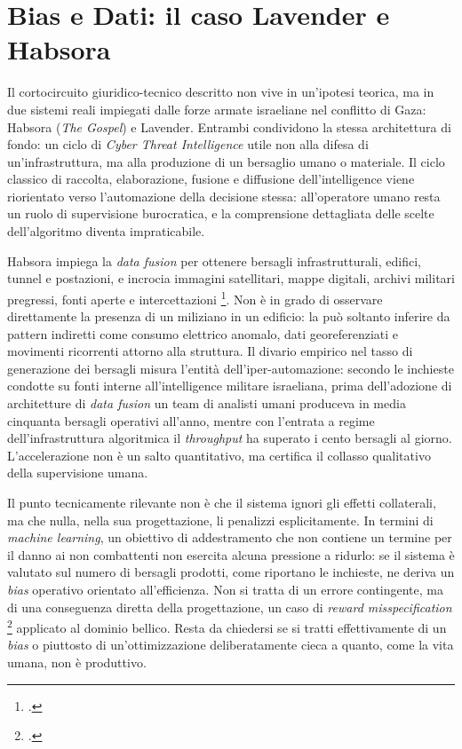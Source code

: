 \ifstampa\documentclass[a4paper,12pt,twoside,openright]{report}\else\documentclass[a4paper,12pt]{report}\fi
\newif\ifrevisione \revisionefalse
\DeclareRobustCommand{\rev}[1]{\ifrevisione{\color{blue!65!black}#1}\else#1\fi}
\begin{document}
\section{Bias e Dati: il caso Lavender e Habsora}

Il cortocircuito giuridico-tecnico descritto non vive in un'ipotesi teorica, ma
in due sistemi reali impiegati dalle forze armate israeliane nel conflitto di
Gaza: Habsora (\textit{The Gospel}) e Lavender. Entrambi condividono la stessa
architettura di fondo: un ciclo di \textit{Cyber Threat Intelligence} utile non
alla difesa di un'infrastruttura, ma alla produzione di un bersaglio umano o
materiale. Il ciclo classico di raccolta, elaborazione, fusione e diffusione
dell'intelligence viene riorientato verso l'automazione della decisione stessa:
all'operatore umano resta un ruolo di supervisione burocratica, e la comprensione
dettagliata delle scelte dell'algoritmo diventa impraticabile.

Habsora impiega la \textit{data fusion} per ottenere bersagli infrastrutturali,
edifici, tunnel e postazioni, e incrocia immagini satellitari, mappe digitali,
archivi militari pregressi, fonti aperte e intercettazioni
\footcite{abraham_2023_gospel}. Non è in grado di osservare direttamente la
presenza di un miliziano in un edificio: la può soltanto inferire da pattern
indiretti come consumo elettrico anomalo, dati georeferenziati e movimenti
ricorrenti attorno alla struttura. Il divario empirico nel tasso di generazione
dei bersagli misura l'entità dell'iper-automazione: secondo le inchieste condotte
su fonti interne all'intelligence militare israeliana, prima dell'adozione di
architetture di \textit{data fusion} un team di analisti umani produceva in media
cinquanta bersagli operativi all'anno, mentre con l'entrata a regime
dell'infrastruttura algoritmica il \textit{throughput} ha superato i cento
bersagli al giorno. L'accelerazione non è un salto quantitativo, ma certifica il
collasso qualitativo della supervisione umana.

Il punto tecnicamente rilevante non è che il sistema ignori gli effetti
collaterali, ma che \rev{nulla, nella sua progettazione, li penalizzi esplicitamente.
In termini di \textit{machine learning}, un obiettivo di addestramento che non
contiene un termine per il danno ai non combattenti non esercita alcuna
pressione a ridurlo: se il sistema è valutato sul numero di bersagli prodotti,
come riportano le inchieste, ne deriva un \textit{bias} operativo orientato
all'efficienza.} Non
si tratta di un errore contingente, ma di una conseguenza diretta della
progettazione, un caso di \textit{reward misspecification} \footcite{amodei_2016}
applicato al dominio bellico. Resta da chiedersi se si tratti effettivamente di
un \textit{bias} o piuttosto di un'ottimizzazione deliberatamente cieca a quanto,
come la vita umana, non è produttivo.
\end{document}

